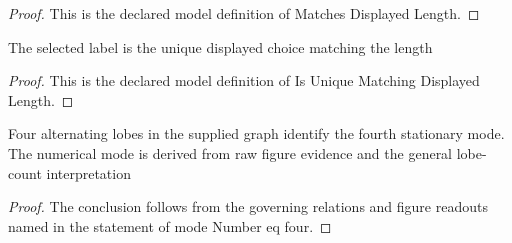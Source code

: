 \begin{proof}
  This is the declared model definition of Matches Displayed Length.
\end{proof}
\begin{definition}
  \label{def:physics:phyx-mini-0656:phyxminiproblems-problemphyxmini0656-isuniquematchingdisplayedlength}
  The selected label is the unique displayed choice matching the length
\end{definition}
\begin{proof}
  This is the declared model definition of Is Unique Matching Displayed Length.
\end{proof}
\begin{lemma}
  \label{lem:physics:phyx-mini-0656:phyxminiproblems-problemphyxmini0656-modenumber-eq-four}
  Four alternating lobes in the supplied graph identify the fourth stationary mode. The numerical mode is derived from raw figure evidence and the general lobe-count interpretation
\end{lemma}
\begin{proof}
  The conclusion follows from the governing relations and figure readouts named in the statement of mode Number eq four.
\end{proof}
